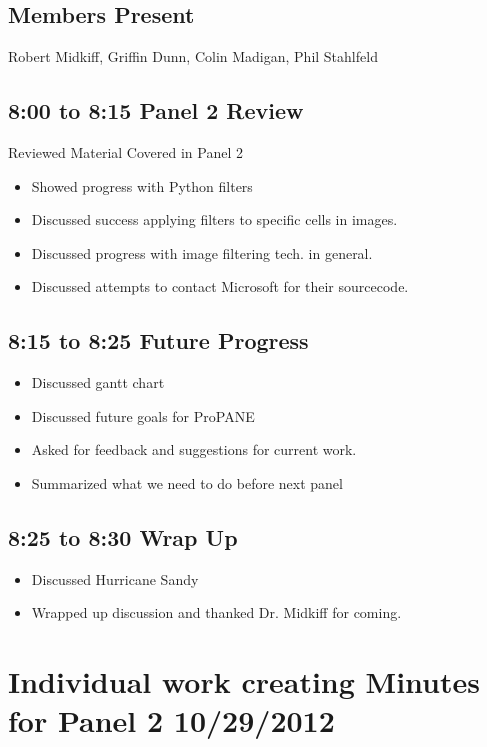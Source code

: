 \documentclass[]{article}
\begin{document}
		\subsection{Members Present}
			Robert Midkiff, Griffin Dunn, Colin Madigan, Phil Stahlfeld
		\subsection{8:00 to 8:15 Panel 2 Review}
			\noindent Reviewed Material Covered in Panel 2
			\begin{itemize}
					\item Showed progress with Python filters
					\item Discussed success applying filters to specific cells in images.
					\item Discussed progress with image filtering tech. in general.
					\item Discussed attempts to contact Microsoft for their sourcecode.
			\end{itemize}
			
		\subsection{8:15 to 8:25 Future Progress}
		
				\begin{itemize}
					\item Discussed gantt chart
					\item Discussed future goals for ProPANE
					\item Asked for feedback and suggestions for current work.
					\item Summarized what we need to do before next panel
				\end{itemize}
			
		\subsection{8:25 to 8:30 Wrap Up}
			
				\begin{itemize}
					\item Discussed Hurricane Sandy
					\item Wrapped up discussion and thanked Dr. Midkiff for coming.
				\end{itemize}
	
	\section{Individual work creating Minutes for Panel 2 10/29/2012}
	
\end{document}
